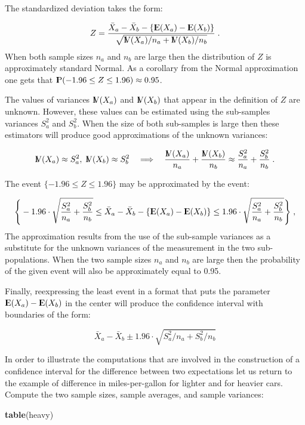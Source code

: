 \documentclass[]{krantz}
\makeatletter
\newenvironment{Shaded}{\begin{snugshade}}{\end{snugshade}}
\newcommand{\KeywordTok}[1]{\textcolor[rgb]{0.13,0.29,0.53}{\textbf{#1}}}
\newcommand{\NormalTok}[1]{#1}
\newcommand{\Expec}{{\rm I\kern-.3em E}}
\newcommand{\Prob}{{\rm I\kern-.3em P}}
\newcommand{\Var}{{\rm I\kern-.3em V}}
\newenvironment{kframe}{%
\medskip{}
\setlength{\fboxsep}{.8em}
 \def\at@end@of@kframe{}%
 \ifinner\ifhmode%
  \def\at@end@of@kframe{\end{minipage}}%
  \begin{minipage}{\columnwidth}%
 \fi\fi%
 \def\FrameCommand##1{\hskip\@totalleftmargin \hskip-\fboxsep
 \colorbox{shadecolor}{##1}\hskip-\fboxsep
     \hskip-\linewidth \hskip-\@totalleftmargin \hskip\columnwidth}%
 \MakeFramed {\advance\hsize-\width
   \@totalleftmargin\z@ \linewidth\hsize
   \@setminipage}}%
 {\par\unskip\endMakeFramed%
 \at@end@of@kframe}
\renewenvironment{Shaded}{\begin{kframe}}{\end{kframe}}
\theoremstyle{definition}
\theoremstyle{definition}
\theoremstyle{definition}
\theoremstyle{remark}
\makeatother
\begin{document}
The standardized deviation takes the form:

\[Z = \frac{\bar X_a- \bar X_b - \{\Expec(X_a)- \Expec(X_b)\}}{\sqrt{\Var(X_a)/n_a +\Var(X_b)/n_b}}\;.\]
When both sample sizes \(n_a\) and \(n_b\) are large then the
distribution of \(Z\) is approximately standard Normal. As a corollary
from the Normal approximation one gets that
\(\Prob(-1.96 \leq Z \leq 1.96) \approx 0.95\).

The values of variances \(\Var(X_a)\) and \(\Var(X_b)\) that appear in
the definition of \(Z\) are unknown. However, these values can be
estimated using the sub-samples variances \(S_a^2\) and \(S_b^2\). When
the size of both sub-samples is large then these estimators will produce
good approximations of the unknown variances:

\[\Var(X_a) \approx S_a^2,\; \Var(X_b) \approx S_b^2\quad \Longrightarrow \quad\frac{\Var(X_a)}{n_a} + \frac{\Var(X_b)}{n_b} \approx  \frac{S_a^2}{n_a} + \frac{S_b^2}{n_b}\;.\]

The event \(\{-1.96 \leq Z \leq 1.96\}\) may be approximated by the
event:

\[\Bigg\{-1.96 \cdot \sqrt{\frac{S_a^2}{n_a} + \frac{S_b^2}{n_b}} \leq \bar X_a- \bar X_b - \{\Expec(X_a)- \Expec(X_b)\} \leq 1.96 \cdot \sqrt{\frac{S_a^2}{n_a} + \frac{S_b^2}{n_b}}\Bigg\}\;,\]
The approximation results from the use of the sub-sample variances as a
substitute for the unknown variances of the measurement in the two
sub-populations. When the two sample sizes \(n_a\) and \(n_b\) are large
then the probability of the given event will also be approximately equal
to 0.95.

Finally, reexpressing the least event in a format that puts the
parameter \(\Expec(X_a)- \Expec(X_b)\) in the center will produce the
confidence interval with boundaries of the form:

\[\bar X_a- \bar X_b \pm 1.96 \cdot \sqrt{S_a^2/n_a + S_b^2/n_b}\]

In order to illustrate the computations that are involved in the
construction of a confidence interval for the difference between two
expectations let us return to the example of difference in
miles-per-gallon for lighter and for heavier cars. Compute the two
sample sizes, sample averages, and sample variances:

\begin{Shaded}
\begin{Highlighting}[]
\KeywordTok{table}\NormalTok{(heavy)}
\end{Highlighting}
\end{Shaded}
\end{document}

